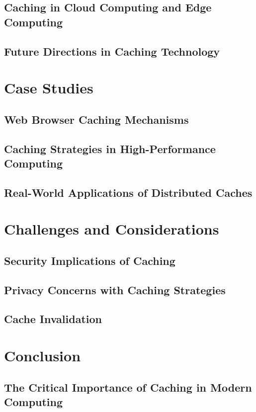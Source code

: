 \documentclass[12pt]{book} %
\begin{document}
\subsection{Caching in Cloud Computing and Edge Computing}
\subsection{Future Directions in Caching Technology}

\section{Case Studies}
\subsection{Web Browser Caching Mechanisms}
\subsection{Caching Strategies in High-Performance Computing}
\subsection{Real-World Applications of Distributed Caches}

\section{Challenges and Considerations}
\subsection{Security Implications of Caching}
\subsection{Privacy Concerns with Caching Strategies}
\subsection{Cache Invalidation}

\section{Conclusion}
\subsection{The Critical Importance of Caching in Modern Computing}
\end{document}
